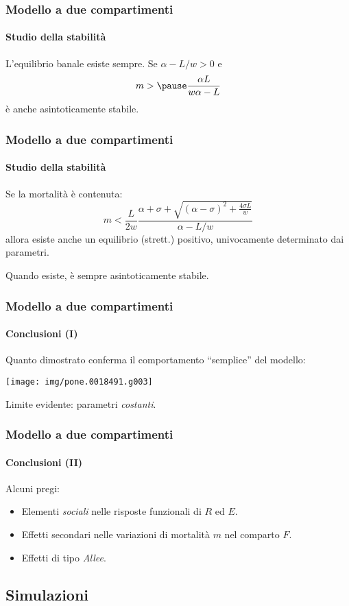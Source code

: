 \documentclass[]{beamer}
\begin{document}
\begin{frame}
    \frametitle{Modello a due compartimenti}
    \framesubtitle{Studio della stabilità}

    L'equilibrio banale esiste sempre. Se $\alpha -L/w>0$ e
    $$m> \pause \frac{\alpha L}{w \alpha -L}$$
    è anche asintoticamente stabile.
\end{frame}

\begin{frame}
    \frametitle{Modello a due compartimenti}
    \framesubtitle{Studio della stabilità}

    Se la mortalità è contenuta:
    $$m < \frac{L}{2w} \frac{ \alpha + \sigma + \sqrt{ {(\alpha - \sigma)}^2 + \frac{4 \sigma L}{w} } }{\alpha - L/w}$$
    allora esiste anche un equilibrio (strett.) positivo, univocamente determinato dai parametri.

    \pause
    Quando esiste, è sempre asintoticamente stabile.
\end{frame}

\begin{frame}
    \frametitle{Modello a due compartimenti}
    \framesubtitle{Conclusioni (I)}

    Quanto dimostrato conferma il comportamento ``semplice'' del modello:
    \begin{center}
        \texttt{[image: img/pone.0018491.g003]}
    \end{center}

    \pause
    Limite evidente: parametri \emph{costanti}.
\end{frame}

\begin{frame}
    \frametitle{Modello a due compartimenti}
    \framesubtitle{Conclusioni (II)}

    Alcuni pregi:
    \begin{itemize}
        \item \pause Elementi \emph{sociali} nelle risposte funzionali di $R$ ed $E$.
        \item \pause Effetti secondari nelle variazioni di mortalità $m$ nel comparto $F$.
        \item \pause Effetti di tipo \emph{Allee}.
    \end{itemize}
\end{frame}


\subsection{Simulazioni}
\end{document}
